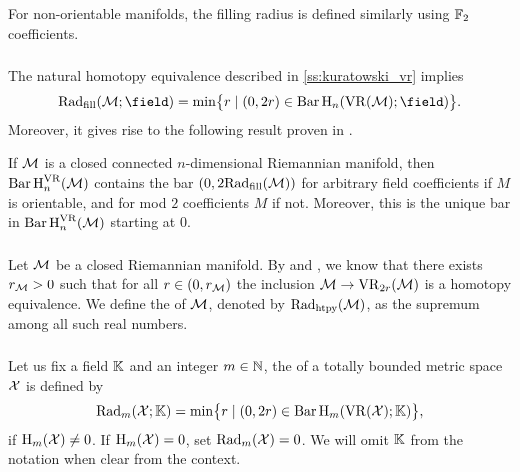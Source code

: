 For non-orientable manifolds, the filling radius is defined similarly using \(\Ftwo\) coefficients.

\subsubsection{}

The natural homotopy equivalence described in \cref{ss:kuratowski_vr} implies 
\[
\fillrad(\cM; \field) = \min\set[\big]{r \mid (0, 2r) \in \barc \rH_n(\VR(\cM); \field)}.
\]
Moreover, it gives rise to the following result proven in \cite[Prop.~9.28]{lim2024vietoris}.

\medskip\lemma
If $\cM$ is a closed connected $n$-dimensional Riemannian manifold, then \(\Hbarc{n}{\cM}\) contains the bar \((0,2\fillrad(\cM))\) for arbitrary field coefficients if $M$ is orientable, and for mod $2$ coefficients $M$ if not.
Moreover, this is the unique bar in \(\Hbarc{n}{\cM}\) starting at $0$.

\subsubsection{}\label{ss:first_critical_value}

Let \(\cM\) be a closed Riemannian manifold.
By \cite[Thm.~3.5]{hausmann1995vietoris} and \cite[Thm.~4.1]{lim2024vietoris}, we know that there exists \(r_\cM > 0\) such that for all \(r \in (0, r_\cM)\) the inclusion \(\cM \to \VR_{2r}(\cM)\) is a homotopy equivalence.
We define the  of \(\cM\), denoted by \(\crit(\cM)\), as the supremum among all such real numbers.

\subsubsection{}

Let us fix a field \(\bK\) and an integer \(m \in \N\), the  of a totally bounded metric space \(\cX\) is defined by
\[
\firstdeath{m}{\cX; \bK} = \min\set[\big]{r \mid (0, 2r) \in \barc \rH_m(\VR(\cX); \bK)},
\]
if \(\rH_\degp(\cX) \neq 0\).
If \(\rH_\degp(\cX) = 0\), set \(\firstdeath{m}{\cX} = 0\).
We will omit \(\bK\) from the notation when clear from the context.

